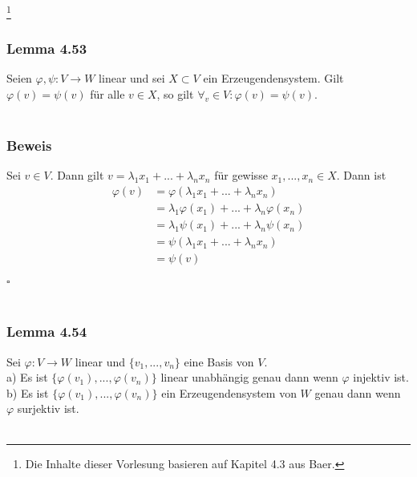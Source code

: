 \documentclass{article}
\begin{document}
\newpage
\date{Donnerstag, 25.01.18} \footnote[1]{Die Inhalte dieser Vorlesung basieren auf Kapitel 4.3 aus Baer.}
\subsubsection*{Lemma 4.53}
Seien $\varphi, \psi: V \rightarrow W$ linear und sei $X \subset V$ ein Erzeugendensystem.
Gilt $\varphi(v) = \psi(v)$ für alle $v \in X$, so gilt $\forall_v \in V: \varphi(v) = \psi(v)$. \\
\\
\subsubsection*{Beweis}
Sei $v \in V$. Dann gilt $v = \lambda_1 x_1 + ... + \lambda_n x_n$ für gewisse $x_1,...,x_n \in X$. Dann ist \\
\begin{align*}
    \varphi(v) &= \varphi(\lambda_1 x_1 + ... + \lambda_n x_n) \\
    &= \lambda_1 \varphi(x_1) + ... + \lambda_n \varphi(x_n) \\
    &= \lambda_1 \psi(x_1) + ... + \lambda_n \psi(x_n) \\
    &= \psi(\lambda_1 x_1 + ... + \lambda_n x_n) \\
    &= \psi(v) \\
\end{align*}
$\square$ \\
\\
\subsubsection*{Lemma 4.54}
Sei $\varphi: V \rightarrow W$ linear und $\{v_1,...,v_n\}$ eine Basis von $V$. \\
a) Es ist $\{\varphi(v_1),...,\varphi(v_n)\}$ linear unabhängig genau dann wenn $\varphi$ injektiv ist. \\
b) Es ist $\{\varphi(v_1),...,\varphi(v_n)\}$ ein Erzeugendensystem von $W$ genau dann wenn $\varphi$ surjektiv ist. \\
\\
\end{document}
